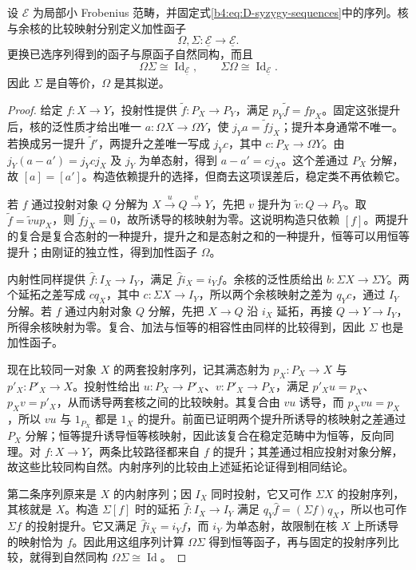 \begin{theorem}\label{b4:thm:D-stable-syzygy-equivalence}
	设 \(\mathcal E\) 为局部小 Frobenius 范畴，并固定式\eqref{b4:eq:D-syzygy-sequences}中的序列。核与余核的比较映射分别定义加性函子
	\[
		\Omega,\Sigma:\underline{\mathcal E}\longrightarrow\underline{\mathcal E}.
	\]
	更换已选序列得到的函子与原函子自然同构，而且
	\[
		\Omega\Sigma\cong\operatorname{Id}_{\underline{\mathcal E}}, \qquad \Sigma\Omega\cong\operatorname{Id}_{\underline{\mathcal E}}.
	\]
	因此 \(\Sigma\) 是自等价，\(\Omega\) 是其拟逆。
\end{theorem}
\begin{proof}
	给定 \(f:X\to Y\)，投射性提供 \(\widetilde f:P_X\to P_Y\)，满足 \(p_Y\widetilde f=fp_X\)。固定这张提升后，核的泛性质才给出唯一 \(a:\Omega X\to\Omega Y\)，使 \(j_Ya=\widetilde f j_X\)；提升本身通常不唯一。若换成另一提升 \(\widetilde f'\)，两提升之差唯一写成 \(j_Yc\)，其中 \(c:P_X\to\Omega Y\)。由 \(j_Y(a-a')=j_Ycj_X\) 及 \(j_Y\) 为单态射，得到 \(a-a'=cj_X\)。这个差通过 \(P_X\) 分解，故 \([a]=[a']\)。构造依赖提升的选择，但商去这项误差后，稳定类不再依赖它。

	若 \(f\) 通过投射对象 \(Q\) 分解为 \(X\xrightarrow{u}Q\xrightarrow{v}Y\)，先把 \(v\) 提升为 \(\widetilde v:Q\to P_Y\)。取 \(\widetilde f=\widetilde vup_X\)，则 \(\widetilde f j_X=0\)，故所诱导的核映射为零。这说明构造只依赖 \([f]\)。两提升的复合是复合态射的一种提升，提升之和是态射之和的一种提升，恒等可以用恒等提升；由刚证的独立性，得到加性函子 \(\Omega\)。

	内射性同样提供 \(\widehat f:I_X\to I_Y\)，满足 \(\widehat f i_X=i_Yf\)。余核的泛性质给出 \(b:\Sigma X\to\Sigma Y\)。两个延拓之差写成 \(c q_X\)，其中 \(c:\Sigma X\to I_Y\)，所以两个余核映射之差为 \(q_Yc\)，通过 \(I_Y\) 分解。若 \(f\) 通过内射对象 \(Q\) 分解，先把 \(X\to Q\) 沿 \(i_X\) 延拓，再接 \(Q\to Y\to I_Y\)，所得余核映射为零。复合、加法与恒等的相容性由同样的比较得到，因此 \(\Sigma\) 也是加性函子。

	现在比较同一对象 \(X\) 的两套投射序列，记其满态射为 \(p_X:P_X\to X\) 与 \(p'_X:P'_X\to X\)。投射性给出 \(u:P_X\to P'_X\)、\(v:P'_X\to P_X\)，满足 \(p'_Xu=p_X\)、\(p_Xv=p'_X\)，从而诱导两套核之间的比较映射。其复合由 \(vu\) 诱导，而 \(p_Xvu=p_X\)，所以 \(vu\) 与 \(1_{P_X}\) 都是 \(1_X\) 的提升。前面已证明两个提升所诱导的核映射之差通过 \(P_X\) 分解；恒等提升诱导恒等核映射，因此该复合在稳定范畴中为恒等，反向同理。对 \(f:X\to Y\)，两条比较路径都来自 \(f\) 的提升；其差通过相应投射对象分解，故这些比较同构自然。内射序列的比较由上述延拓论证得到相同结论。

	第二条序列原来是 \(X\) 的内射序列；因 \(I_X\) 同时投射，它又可作 \(\Sigma X\) 的投射序列，其核就是 \(X\)。构造 \(\Sigma[f]\) 时的延拓 \(\widehat f:I_X\to I_Y\) 满足 \(q_Y\widehat f=(\Sigma f)q_X\)，所以也可作 \(\Sigma f\) 的投射提升。它又满足 \(\widehat f i_X=i_Yf\)，而 \(i_Y\) 为单态射，故限制在核 \(X\) 上所诱导的映射恰为 \(f\)。因此用这组序列计算 \(\Omega\Sigma\) 得到恒等函子，再与固定的投射序列比较，就得到自然同构 \(\Omega\Sigma\cong\operatorname{Id}\)。


\end{proof}
